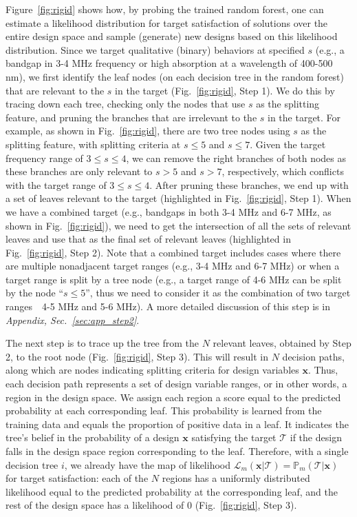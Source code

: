 \documentclass{article}
\begin{document}
Figure~\ref{fig:rigid} shows how, by probing the trained random forest, one can estimate a likelihood distribution for target satisfaction of solutions over the entire design space and sample (generate) new designs based on this likelihood distribution. Since we target qualitative (binary) behaviors at specified $s$ (e.g., a bandgap in 3-4 MHz frequency or high absorption at a wavelength of 400-500 nm), we first identify the leaf nodes (on each decision tree in the random forest) that are relevant to the $s$ in the target (Fig.~\ref{fig:rigid}, Step 1). We do this by tracing down each tree, checking only the nodes that use $s$ as the splitting feature, and pruning the branches that are irrelevant to the $s$ in the target. For example, as shown in Fig.~\ref{fig:rigid}, there are two tree nodes using $s$ as the splitting feature, with splitting criteria at $s \leq 5$ and $s \leq 7$. Given the target frequency range of $3 \leq s \leq 4$, we can remove the right branches of both nodes as these branches are only relevant to $s>5$ and $s>7$, respectively, which conflicts with the target range of $3 \leq s \leq 4$. After pruning these branches, we end up with a set of leaves relevant to the target (highlighted in Fig.~\ref{fig:rigid}, Step 1). When we have a combined target (e.g., bandgaps in both 3-4 MHz and 6-7 MHz, as shown in Fig.~\ref{fig:rigid}), we need to get the intersection of all the sets of relevant leaves and use that as the final set of relevant leaves (highlighted in Fig.~\ref{fig:rigid}, Step 2). Note that a combined target includes cases where there are multiple nonadjacent target ranges (e.g., 3-4 MHz and 6-7 MHz) or when a target range is split by a tree node (e.g., a target range of 4-6 MHz can be split by the node ``$s \leq 5$'', thus we need to consider it as the combination of two target ranges~\textemdash~4-5 MHz and 5-6 MHz). A more detailed discussion of this step is in \textit{Appendix, Sec.~\ref{sec:app_step2}}.

The next step is to trace up the tree from the $N$ relevant leaves, obtained by Step 2, to the root node (Fig.~\ref{fig:rigid}, Step 3). This will result in $N$ decision paths, along which are nodes indicating splitting criteria for design variables $\mathbf{x}$. Thus, each decision path represents a set of design variable ranges, or in other words, a region in the design space. We assign each region a score equal to the predicted probability at each corresponding leaf. This probability is learned from the training data and equals the proportion of positive data in a leaf. It indicates the tree's belief in the probability of a design $\mathbf{x}$ satisfying the target $\mathcal{T}$ if the design falls in the design space region corresponding to the leaf. Therefore, with a single decision tree $i$, we already have the map of likelihood $\mathcal{L}_m(\mathbf{x}|\mathcal{T})=\mathbb{P}_m(\mathcal{T}|\mathbf{x})$ for target satisfaction: each of the $N$ regions has a uniformly distributed likelihood equal to the predicted probability at the corresponding leaf, and the rest of the design space has a likelihood of 0 (Fig.~\ref{fig:rigid}, Step 3).
\end{document}
